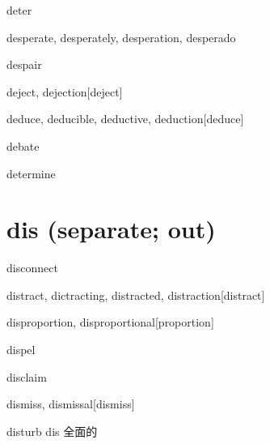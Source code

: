 \begin{RefWord}{deter}
\end{RefWord}

\begin{RefWord}{desperate, desperately, desperation, desperado}
\end{RefWord}

\begin{RefWord}{despair}
\end{RefWord}

\begin{RefWord}{deject, dejection}[deject]
\end{RefWord}

\begin{RefWord}{deduce, deducible, deductive, deduction}[deduce]
\end{RefWord}

\begin{RefWord}{debate}
\end{RefWord}

\begin{RefWord}{determine}
\end{RefWord}

\section{dis (separate; out)}

\begin{RefWord}{disconnect}
\end{RefWord}

\begin{RefWord}{distract, dictracting, distracted, distraction}[distract]
\end{RefWord}

\begin{RefWord}{disproportion, disproportional}[proportion]
\end{RefWord}

\begin{RefWord}{dispel}
\end{RefWord}

\begin{RefWord}{disclaim}
\end{RefWord}

\begin{RefWord}{dismiss, dismissal}[dismiss]
\end{RefWord}

\begin{RefWord}{disturb}
    dis 全面的
\end{RefWord}


